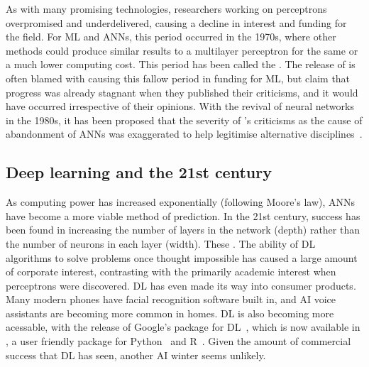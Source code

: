 As with many promising technologies, researchers working on perceptrons overpromised and underdelivered, causing a decline in interest and funding for the field.
For ML and \acp{ANN}, this period occurred in the 1970s, where other methods could produce similar results to a multilayer perceptron for the same or a much lower computing cost.
This period has been called the .
The release of  is often blamed with causing this fallow period in funding for ML, but \citeauthor{minsky1987} claim that progress was already stagnant when they published their criticisms, and it would have occurred irrespective of their opinions.
With the revival of neural networks in the 1980s, it has been proposed that the severity of \citeauthor{minsky1987}'s criticisms as the cause of abandonment of \acp{ANN} was exaggerated to help legitimise alternative disciplines~\autocite[649]{olazaran1996}.

\subsection{Deep learning and the 21st century} \label{deeplearning}

As computing power has increased exponentially (following Moore's law), \acp{ANN} have become a more viable method of prediction.
In the 21st century, success has been found in increasing the number of layers in the network (depth) rather than the number of neurons in each layer (width).
These  .
The ability of \ac{DL} algorithms to solve problems once thought impossible has caused a large amount of corporate interest, contrasting with the primarily academic interest when perceptrons were discovered.
\ac{DL} has even made its way into consumer products.
Many modern phones have facial recognition software built in, and \ac{AI} voice assistants are becoming more common in homes.
\ac{DL} is also becoming more acessable, with the release of Google's  package for \ac{DL}~\autocite{abadi2016}, which is now available in , a user friendly package for Python~\autocite{chollet2015} and R~\autocite{allaire2018}.
Given the amount of commercial success that \ac{DL} has seen, another AI winter seems unlikely.
